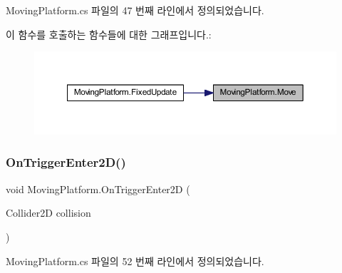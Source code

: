 Moving\+Platform.\+cs 파일의 47 번째 라인에서 정의되었습니다.


\begin{DoxyCode}{0}

\end{DoxyCode}
이 함수를 호출하는 함수들에 대한 그래프입니다.\+:\nopagebreak
\begin{figure}[H]
\begin{center}
\leavevmode
\includegraphics[width=350pt]{df/d42/class_moving_platform_a6042324f3ff144a49863cd515eabfbbb_icgraph}
\end{center}
\end{figure}
\mbox{\label{class_moving_platform_ad9ff97c68ae6e8dbf202009afcd139ce}} 
\subsubsection{\texorpdfstring{OnTriggerEnter2D()}{OnTriggerEnter2D()}}
{\footnotesize\ttfamily void Moving\+Platform.\+On\+Trigger\+Enter2D (\begin{DoxyParamCaption}\item[{Collider2D}]{collision }\end{DoxyParamCaption})\hspace{0.3cm}{\ttfamily [private]}}



Moving\+Platform.\+cs 파일의 52 번째 라인에서 정의되었습니다.


